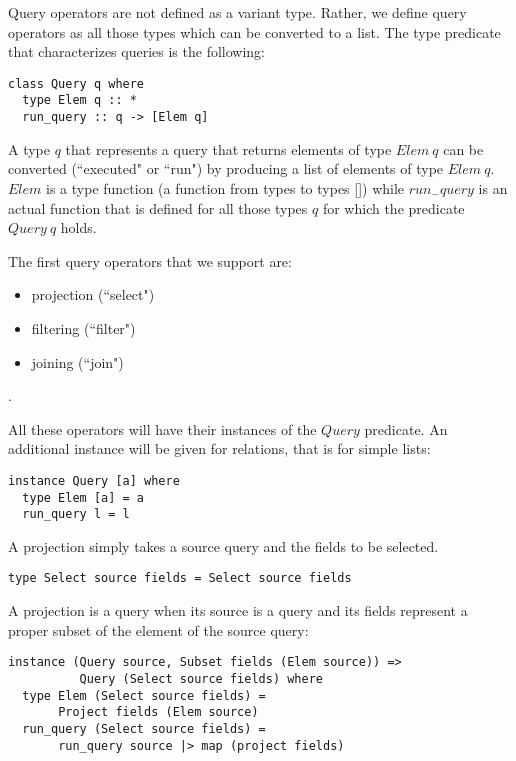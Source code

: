 
Query operators are not defined as a variant type. Rather, we define query operators as all those types which can be converted to a list. The type predicate that characterizes queries is the following:

\begin{lstlisting}
class Query q where
  type Elem q :: *
  run_query :: q -> [Elem q]
\end{lstlisting}

A type $q$ that represents a query that returns elements of type $Elem\ q$ can be converted (``executed" or ``run") by producing a list of elements of type $Elem\ q$. $Elem$ is a type function (a function from types to types []) while $run_{-}query$ is an actual function that is defined for all those types $q$ for which the predicate $Query\ q$ holds.

The first query operators that we support are:
\begin{itemize}
\item projection (``select")
\item filtering (``filter")
\item joining (``join")
\end{itemize}.

All these operators will have their instances of the $Query$ predicate. An additional instance will be given for relations, that is for simple lists:

\begin{lstlisting}
instance Query [a] where
  type Elem [a] = a
  run_query l = l
\end{lstlisting}

A projection simply takes a source query and the fields to be selected.
\begin{lstlisting}
type Select source fields = Select source fields
\end{lstlisting}

A projection is a query when its source is a query and its fields represent a proper subset of the element of the source query:
\begin{lstlisting}
instance (Query source, Subset fields (Elem source)) => 
          Query (Select source fields) where
  type Elem (Select source fields) = 
       Project fields (Elem source)
  run_query (Select source fields) = 
       run_query source |> map (project fields)
\end{lstlisting}

